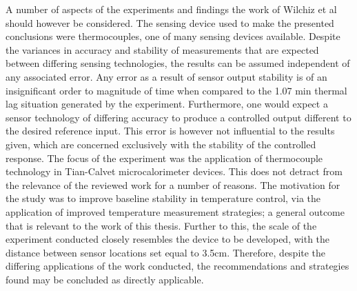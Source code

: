 A number of aspects of the experiments and findings the work of Wilchiz et al should however be considered. The sensing device used to make the presented conclusions were thermocouples, one of many sensing devices available. Despite the variances in accuracy and stability of measurements that are expected between differing sensing technologies, the results can be assumed independent of any associated error. Any error as a result of sensor output stability is of an insignificant order to magnitude of time when compared to the 1.07 min thermal lag situation generated by the experiment. Furthermore, one would expect a sensor technology of differing accuracy to produce a controlled output different to the desired reference input. This error is however not influential to the results given, which are concerned exclusively with the stability of the controlled response. The focus of the experiment was the application of thermocouple technology in Tian-Calvet microcalorimeter devices. This does not detract from the relevance of the reviewed work for a number of reasons. The motivation for the study was to improve baseline stability in temperature control, via the application of improved temperature measurement strategies; a general outcome that is relevant to the work of this thesis. Further to this, the scale of the experiment conducted closely resembles the device to be developed, with the distance between sensor locations set equal to 3.5cm. Therefore, despite the differing applications of the work conducted, the recommendations and strategies found may be concluded as directly applicable.\\

